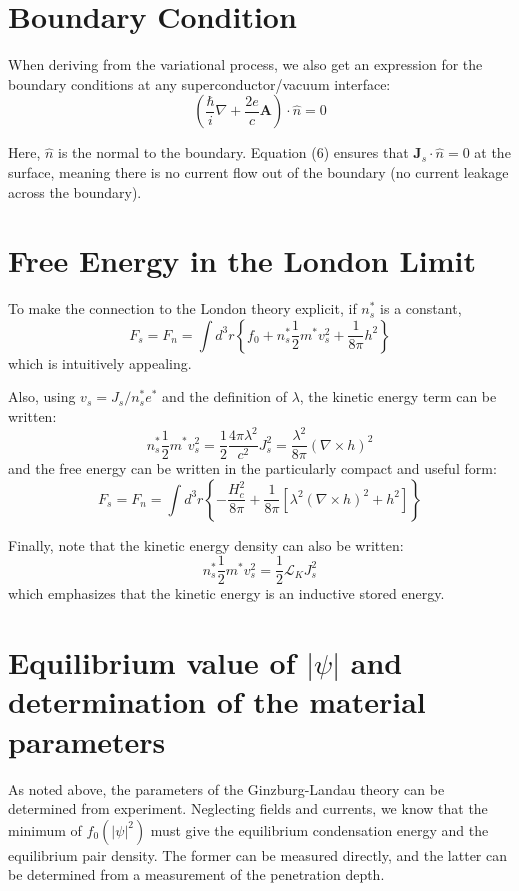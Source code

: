 \documentclass{article}
\begin{document}
\section{Boundary Condition}

When deriving from the variational process, we also get an expression for the boundary conditions at any superconductor/vacuum interface:
\begin{equation}
    \left( \frac{\hbar}{i} \nabla + \frac{2e}{c} \mathbf{A} \right) \cdot \hat{n} = 0 \tag{21}
\end{equation}

Here, $\hat{n}$ is the normal to the boundary. Equation (6) ensures that $\mathbf{J}_s \cdot \hat{n} = 0$ at the surface, meaning there is no current flow out of the boundary (no current leakage across the boundary).

\section{Free Energy in the London Limit}

To make the connection to the London theory explicit, if $n_s^*$ is a constant, 
\[
F_s = F_n = \int d^3r \left\{ f_0 + n_s^* \frac{1}{2} m^* v_s^2 + \frac{1}{8\pi} h^2 \right\} \tag{25}
\]
which is intuitively appealing.

Also, using $v_s = J_s / n_s^* e^*$ and the definition of $\lambda$, the kinetic energy term can be written:
\[
n_s^* \frac{1}{2} m^* v_s^2 = \frac{1}{2} \frac{4\pi \lambda^2}{c^2} J_s^2 = \frac{\lambda^2}{8\pi} (\nabla \times h)^2 \tag{26}
\]
and the free energy can be written in the particularly compact and useful form:
\[
F_s = F_n = \int d^3r \left\{ -\frac{H_c^2}{8\pi} + \frac{1}{8\pi} \left[ \lambda^2 (\nabla \times h)^2 + h^2 \right] \right\} \tag{27}
\]

Finally, note that the kinetic energy density can also be written:
\[
n_s^* \frac{1}{2} m^* v_s^2 = \frac{1}{2} \mathcal{L}_K J_s^2 \tag{28}
\]
which emphasizes that the kinetic energy is an inductive stored energy.

\section{Equilibrium value of $|\psi|$ and determination of the material parameters}

As noted above, the parameters of the Ginzburg-Landau theory can be determined from experiment. Neglecting fields and currents, we know that the minimum of $f_0(|\psi|^2)$ must give the equilibrium condensation energy and the equilibrium pair density. The former can be measured directly, and the latter can be determined from a measurement of the penetration depth.
\end{document}
